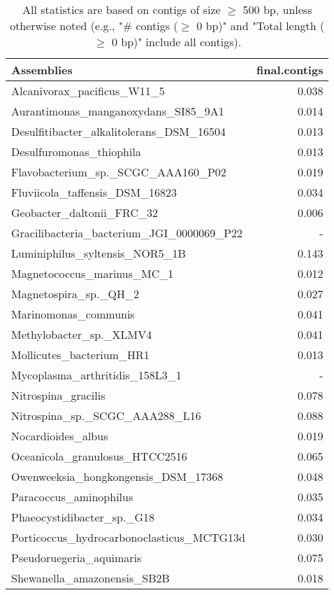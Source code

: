 \documentclass[12pt,a4paper]{article}
\begin{document}
\begin{table}[ht]
\begin{center}
\caption{All statistics are based on contigs of size $\geq$ 500 bp, unless otherwise noted (e.g., "\# contigs ($\geq$ 0 bp)" and "Total length ($\geq$ 0 bp)" include all contigs).}
\begin{tabular}{|l*{1}{|r}|}
\hline
Assemblies & final.contigs \\ \hline
Alcanivorax\_pacificus\_W11\_5 & 0.038 \\ \hline
Aurantimonas\_manganoxydans\_SI85\_9A1 & 0.014 \\ \hline
Desulfitibacter\_alkalitolerans\_DSM\_16504 & 0.013 \\ \hline
Desulfuromonas\_thiophila & 0.013 \\ \hline
Flavobacterium\_sp.\_SCGC\_AAA160\_P02 & 0.019 \\ \hline
Fluviicola\_taffensis\_DSM\_16823 & 0.034 \\ \hline
Geobacter\_daltonii\_FRC\_32 & 0.006 \\ \hline
Gracilibacteria\_bacterium\_JGI\_0000069\_P22 & - \\ \hline
Luminiphilus\_syltensis\_NOR5\_1B & 0.143 \\ \hline
Magnetococcus\_marinus\_MC\_1 & 0.012 \\ \hline
Magnetospira\_sp.\_QH\_2 & 0.027 \\ \hline
Marinomonas\_communis & 0.041 \\ \hline
Methylobacter\_sp.\_XLMV4 & 0.041 \\ \hline
Mollicutes\_bacterium\_HR1 & 0.013 \\ \hline
Mycoplasma\_arthritidis\_158L3\_1 & - \\ \hline
Nitrospina\_gracilis & 0.078 \\ \hline
Nitrospina\_sp.\_SCGC\_AAA288\_L16 & 0.088 \\ \hline
Nocardioides\_albus & 0.019 \\ \hline
Oceanicola\_granulosus\_HTCC2516 & 0.065 \\ \hline
Owenweeksia\_hongkongensis\_DSM\_17368 & 0.048 \\ \hline
Paracoccus\_aminophilus & 0.035 \\ \hline
Phaeocystidibacter\_sp.\_G18 & 0.034 \\ \hline
Porticoccus\_hydrocarbonoclasticus\_MCTG13d & 0.030 \\ \hline
Pseudoruegeria\_aquimaris & 0.075 \\ \hline
Shewanella\_amazonensis\_SB2B & 0.018 \\ \hline

\end{tabular}
\end{center}
\end{table}
\end{document}
